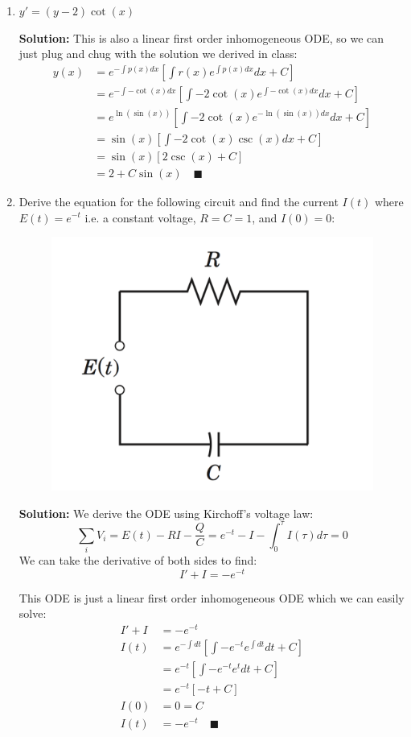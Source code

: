 \documentclass[letterpaper, fontsize=12pt]{scrartcl} %
\numberwithin{equation}{section} %
\numberwithin{figure}{section} %
\numberwithin{table}{section} %
\begin{document}
\begin{enumerate}
\begin{enumerate}[label = (\alph*)]
\item $y' = (y-2)\cot(x)$

\par \textbf{Solution:} This is also a linear first order inhomogeneous ODE, so we can just plug and chug with the solution we derived in class:
\begin{align*}
y(x) &= e^{-\int p(x) dx} \left[ \int r(x) e^{\int p(x) dx} dx + C\right] \\
&=  e^{-\int -\cot(x) dx} \left[ \int -2\cot(x) e^{\int -\cot(x) dx} dx + C\right] \\
&= e^{ \ln(\sin(x))} \left[ \int -2\cot(x) e^{-\ln(\sin(x)) dx} dx + C\right] \\
&= \sin(x) \left[ \int -2\cot(x) \csc(x) dx + C\right] \\
&= \sin(x) \left[ 2\csc(x) + C\right]\\
&= 2 + C\sin(x) \quad\blacksquare
\end{align*}

\item Derive the equation for the following circuit and find the current $I(t)$ where $E(t) = e^{-t}$ i.e. a constant voltage, $R = C = 1$, and $I(0) = 0$: 

\begin{figure}[H]
\centering \includegraphics[width=0.5\columnwidth]{midterm1review_circuit.png}
\end{figure}

\par \textbf{Solution:} We derive the ODE using Kirchoff's voltage law:
\[ \sum_i V_i = E(t) - RI - \frac{Q}{C} = e^{-t} - I - \int_0^\tau I(\tau) d\tau = 0 \]
We can take the derivative of both sides to find:
\[ I' + I = - e^{-t} \]

This ODE is just a linear first order inhomogeneous ODE which we can easily solve:
\begin{align*}
I' + I &= - e^{-t} \\
I(t) &= e^{-\int dt}\left[ \int -e^{-t} e^{\int dt} dt + C\right] \\
&= e^{-t} \left[ \int - e^{-t} e^t dt + C\right] \\
&= e^{-t} \left[ -t + C\right] \\
I(0) &= 0 = C \\
I(t) &= -e^{-t} \quad\blacksquare
\end{align*}


\end{enumerate}
\end{enumerate}
\end{document}

